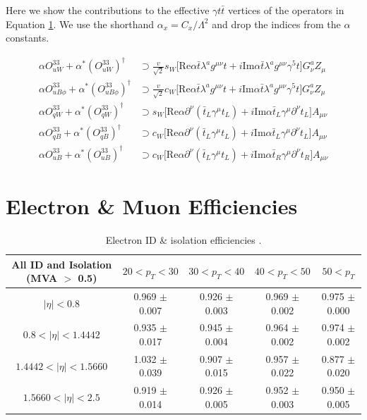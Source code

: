 \documentclass[oneside, a4paper, 11pt, ]{report}
\begin{document}
Here we show the contributions to the effective $\gamma t \bar{t}$ vertices of the operators in Equation \ref{}. We use the shorthand $\alpha_x = C_x/\Lambda^2$ and drop the indices from the $\alpha$ constants.

\begin{align}
\alpha O^{33}_{uW} + \alpha^* (O^{33}_{uW})^{\dagger} & \supset \frac{v}{\sqrt{2}}s_W \lbrack \text{Re} \alpha\bar{t}\lambda^a g^{\mu \nu} t + i \text{Im} \alpha \bar{t}\lambda^a g^{\mu \nu} \gamma^5 t\rbrack G^a_{\nu} Z_{\mu}\\ 
\alpha O^{33}_{uB\phi} + \alpha^* (O^{33}_{uB\phi})^{\dagger} & \supset \frac{v}{\sqrt{2}}c_W \lbrack \text{Re} \alpha\bar{t}\lambda^a g^{\mu \nu} t + i \text{Im} \alpha \bar{t}\lambda^a g^{\mu \nu} \gamma^5 t\rbrack G^a_{\nu} Z_{\mu}\\ 
\alpha O^{33}_{qW} + \alpha^* (O^{33}_{qW})^{\dagger} & \supset s_W \lbrack \text{Re} \alpha\partial^{\nu}(\bar{t}_L\gamma^{\mu}t_L) + i \text{Im} \alpha \bar{t}_L\gamma^{\mu}\partial^{\nu}t_L \rbrack A_{\mu \nu}\\ 
\alpha O^{33}_{qB} + \alpha^* (O^{33}_{qB})^{\dagger} & \supset c_W \lbrack \text{Re} \alpha\partial^{\nu}(\bar{t}_L\gamma^{\mu}t_L) + i \text{Im} \alpha \bar{t}_L\gamma^{\mu}\partial^{\nu}t_L \rbrack A_{\mu \nu}\\ 
\alpha O^{33}_{uB} + \alpha^* (O^{33}_{uB})^{\dagger} & \supset c_W \lbrack \text{Re} \alpha\partial^{\nu}(\bar{t}_L\gamma^{\mu}t_L) + i \text{Im} \alpha \bar{t}_R\gamma^{\mu}\partial^{\nu}t_R \rbrack A_{\mu \nu}  
\end{align}

\section{Electron \& Muon Efficiencies}

\begin{table} \label{tab-ElectronEfficiencies}
\begin{center}
\resizebox{\columnwidth}{!} {
\begin{tabular}{|c|c|c|c|c|}
\hline
	\textbf{All ID and Isolation (MVA $>$ 0.5)} & $20 < p_T < 30$ & $30 < p_T < 40$ & $40 < p_T < 50$ & $50 < p_T$ \\
\hline	
	$|\eta| < 0.8$ & 0.969 $\pm$ 0.007 & 0.926 $\pm$ 0.003 & 0.969 $\pm$ 0.002 & 0.975 $\pm$ 0.000 \\
	$0.8 < |\eta| < 1.4442$ & 0.935 $\pm$ 0.017 & 0.945 $\pm$ 0.004 & 0.964 $\pm$ 0.002 & 0.974 $\pm$ 0.002 \\
	$1.4442 < |\eta| < 1.5660$ & 1.032 $\pm$ 0.039 & 0.907 $\pm$ 0.015 & 0.957 $\pm$ 0.022 & 0.877 $\pm$ 0.020 \\
	$1.5660 < |\eta| < 2.5$ & 0.919 $\pm$ 0.014 & 0.926 $\pm$ 0.005 & 0.952 $\pm$ 0.003 & 0.950 $\pm$ 0.005 \\
\hline	
\end{tabular}
}
\caption{Electron ID \& isolation efficiencies \cite{ElectronEfficiencies}.}
\end{center}
\end{table}
\end{document}
